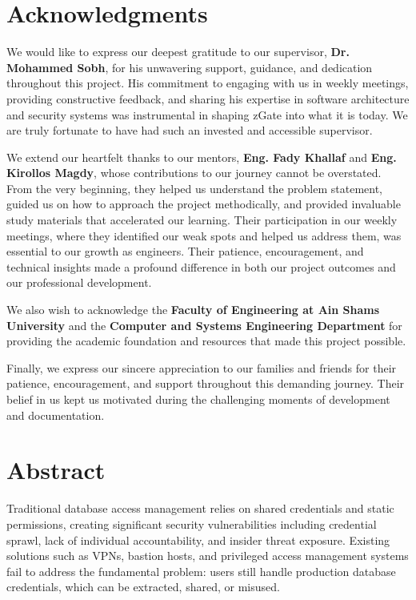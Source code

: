 \documentclass[12pt,a4paper]{report}
\begin{document}
\chapter*{Acknowledgments}
We would like to express our deepest gratitude to our supervisor, \textbf{Dr. Mohammed Sobh}, for his unwavering support, guidance, and dedication throughout this project. His commitment to engaging with us in weekly meetings, providing constructive feedback, and sharing his expertise in software architecture and security systems was instrumental in shaping zGate into what it is today. We are truly fortunate to have had such an invested and accessible supervisor.

We extend our heartfelt thanks to our mentors, \textbf{Eng. Fady Khallaf} and \textbf{Eng. Kirollos Magdy}, whose contributions to our journey cannot be overstated. From the very beginning, they helped us understand the problem statement, guided us on how to approach the project methodically, and provided invaluable study materials that accelerated our learning. Their participation in our weekly meetings, where they identified our weak spots and helped us address them, was essential to our growth as engineers. Their patience, encouragement, and technical insights made a profound difference in both our project outcomes and our professional development.

We also wish to acknowledge the \textbf{Faculty of Engineering at Ain Shams University} and the \textbf{Computer and Systems Engineering Department} for providing the academic foundation and resources that made this project possible.

Finally, we express our sincere appreciation to our families and friends for their patience, encouragement, and support throughout this demanding journey. Their belief in us kept us motivated during the challenging moments of development and documentation.

\newpage

\chapter*{Abstract}
Traditional database access management relies on shared credentials and static permissions, creating significant security vulnerabilities including credential sprawl, lack of individual accountability, and insider threat exposure. Existing solutions such as VPNs, bastion hosts, and privileged access management systems fail to address the fundamental problem: users still handle production database credentials, which can be extracted, shared, or misused.
\end{document}
